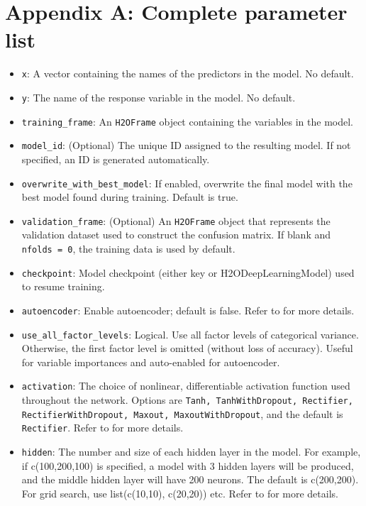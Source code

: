 \documentclass{article}[11pt]
\begin{document}
\section{Appendix A: Complete parameter list}
\begin{itemize}
\item \texttt{x}: A vector containing the names of the predictors in the model. No default.
\item \texttt{y}: The name of the response variable in the model. No default.
\item \texttt{training\_frame}: An \texttt{H2OFrame} object containing the variables in the model.
\item \texttt{model\_id}: (Optional) The unique ID assigned to the resulting model. If not specified, an ID is generated automatically. 
\item \texttt{overwrite\_with\_best\_model}: If enabled, overwrite the final model with the best model found during training. Default is true.
\item \texttt{validation\_frame}: (Optional) An \texttt{H2OFrame} object that represents the validation dataset used to construct the confusion matrix. If blank and \texttt{nfolds = 0}, the training data is used by default. 
\item \texttt{checkpoint}: Model checkpoint (either key or H2ODeepLearningModel) used to resume training. 
\item \texttt{autoencoder}: Enable autoencoder; default is false. Refer to  for more details.
\item \texttt{use\_all\_factor\_levels}: Logical. Use all factor levels of categorical variance. Otherwise, the first factor level is omitted (without loss of accuracy). Useful for variable importances and auto-enabled for autoencoder.
\item \texttt{activation}: The choice of nonlinear, differentiable activation function used throughout the network. Options are \texttt{Tanh, TanhWithDropout, Rectifier, RectifierWithDropout, Maxout, MaxoutWithDropout}, and the default is \texttt{Rectifier}. Refer to   for more details.
\item \texttt{hidden}: The number and size of each hidden layer in the model. For example, if c(100,200,100) is specified, a model with 3 hidden layers will be produced, and the middle hidden layer will have 200 neurons. The default is c(200,200). For grid search, use list(c(10,10), c(20,20)) etc. Refer to   for more details. 

\end{itemize}
\end{document}
